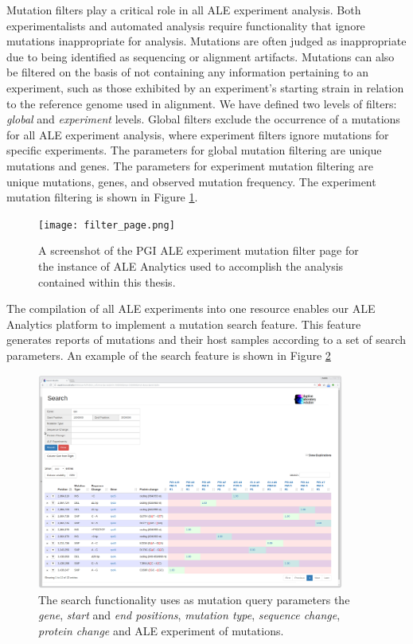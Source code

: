 \documentclass[12pt,final,masters,chapterheads]{ucsd}  %
\begin{document}
Mutation filters play a critical role in all ALE experiment analysis. Both experimentalists and automated analysis require functionality that ignore mutations inappropriate for analysis. Mutations are often judged as inappropriate due to being identified as sequencing or alignment artifacts. Mutations can also be filtered on the basis of not containing any information pertaining to an experiment, such as those exhibited by an experiment's starting strain in relation to the reference genome used in alignment. We have defined two levels of filters: \textit{global} and \textit{experiment} levels. Global filters exclude the occurrence of a mutations for all ALE experiment analysis, where experiment filters ignore mutations for specific experiments. The parameters for global mutation filtering are unique mutations and genes. The parameters for experiment mutation filtering are unique mutations, genes, and observed mutation frequency. The experiment mutation filtering is shown in Figure \ref{fig:filter_page}.
\begin{figure}[H]
  \centering
  \texttt{[image: filter\_page.png]}
  \caption{A screenshot of the PGI ALE experiment mutation filter page for the instance of ALE Analytics used to accomplish the analysis contained within this thesis.}
  \label{fig:filter_page}
\end{figure}
The compilation of all ALE experiments into one resource enables our ALE Analytics platform to implement a mutation search feature. This feature generates reports of mutations and their host samples according to a set of search parameters. An example of the search feature is shown in Figure \ref{fig:search_page}
\begin{figure}[H]
  \centering
  \includegraphics[width=0.9\textwidth]{search_page.png}
  \caption[A screenshot of the mutation search page and search result's mutation report for the instance of ALE Analytics used to accomplish the analysis contained within this thesis.]{ The search functionality uses as mutation query parameters the \textit{gene}, \textit{start} and \textit{end positions}, \textit{mutation type}, \textit{sequence change}, \textit{protein change} and ALE experiment of mutations.}
  \label{fig:search_page}
\end{figure}
\end{document}
